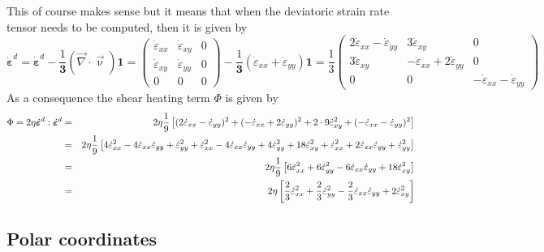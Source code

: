 This of course makes sense but it means that when the deviatoric strain rate tensor needs to be 
computed, then it is given by
\[
\dot{\bm \varepsilon}^d = \dot{\bm \varepsilon}^d - \frac{1}{\bm 3} (\vec\nabla\cdot\vec\upnu) {\bm 1}
=
\left(
\begin{array}{ccc}
\dot{\varepsilon}_{xx} & \dot{\varepsilon}_{xy} &  0 \\
\dot{\varepsilon}_{xy} & \dot{\varepsilon}_{yy} &  0 \\
0 &0 & 0
\end{array}
\right)
- \frac{1}{\bm 3} (\dot{\varepsilon}_{xx}+\dot{\varepsilon}_{yy}) {\bm 1}
=
\frac{1}{3}
\left(
\begin{array}{ccc}
2 \dot{\varepsilon}_{xx} - \dot{\varepsilon}_{yy} & 3\dot{\varepsilon}_{xy} &  0 \\
3\dot{\varepsilon}_{xy} & -\dot{\varepsilon}_{xx}+2 \dot{\varepsilon}_{yy} &  0 \\
0 &0 & -\dot{\varepsilon}_{xx}-\dot{\varepsilon}_{yy}
\end{array}
\right)
\]
As a consequence the shear heating term $\Phi$ is given by 
\begin{eqnarray}
\Phi = 2 \eta \dot{\bm \varepsilon}^d :\dot{\bm \varepsilon}^d 
&=& 2 \eta \frac19
\left[
(2\dot{\varepsilon}_{xx}-\dot{\varepsilon}_{yy})^2 +
(-\dot{\varepsilon}_{xx}+2\dot{\varepsilon}_{yy})^2 +
2\cdot 9\dot{\varepsilon}_{xy}^2
+( -\dot{\varepsilon}_{xx}-\dot{\varepsilon}_{yy})^2 \right] \nonumber\\
&=& 2\eta \frac19
\left[
4\dot{\varepsilon}_{xx}^2 - 4 \dot{\varepsilon}_{xx}\dot{\varepsilon}_{yy}
+\dot{\varepsilon}_{yy}^2
+ \dot{\varepsilon}_{xx}^2 - 4 \dot{\varepsilon}_{xx}\dot{\varepsilon}_{yy}
+ 4\dot{\varepsilon}_{yy}^2
+ 18 \dot{\varepsilon}_{xy}^2
+ \dot{\varepsilon}_{xx}^2 +2\dot{\varepsilon}_{xx}\dot{\varepsilon}_{yy}
+ \dot{\varepsilon}_{yy}^2 \right] \nonumber\\
&=& 2\eta \frac19
\left[ 6 \dot{\varepsilon}_{xx}^2 
+ 6 \dot{\varepsilon}_{yy}^2 
-6 \dot{\varepsilon}_{xx}\dot{\varepsilon}_{yy}
+ 18 \dot{\varepsilon}_{xy}^2 \right] \nonumber\\
&=& 2\eta \left[ \frac{2}{3} \dot{\varepsilon}_{xx}^2 
+ \frac23 \dot{\varepsilon}_{yy}^2 
-\frac23 \dot{\varepsilon}_{xx}\dot{\varepsilon}_{yy}
+ 2 \dot{\varepsilon}_{xy}^2 \right]
\end{eqnarray}


\subsection{Polar coordinates}

